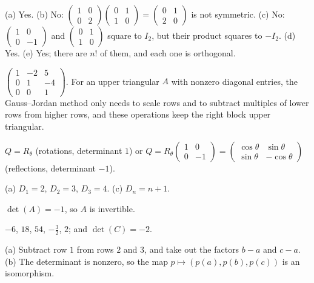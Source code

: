 \documentclass[11pt]{article}
\theoremstyle{definition}
\begin{document}
\begin{description}[leftmargin=0pt, itemsep=0.3em]
    \item[\ref{pr:groups}.] (a) Yes. (b) No: $\begin{pmatrix} 1 & 0 \\ 0 & 2 \end{pmatrix}\begin{pmatrix} 0 & 1 \\ 1 & 0 \end{pmatrix} = \begin{pmatrix} 0 & 1 \\ 2 & 0 \end{pmatrix}$ is not symmetric. (c) No: $\begin{pmatrix} 1 & 0 \\ 0 & -1 \end{pmatrix}$ and $\begin{pmatrix} 0 & 1 \\ 1 & 0 \end{pmatrix}$ square to $I_2$, but their product squares to $-I_2$. (d) Yes. (e) Yes; there are $n!$ of them, and each one is orthogonal.
    \item[\ref{pr:inverse-triangular}.] $\begin{pmatrix} 1 & -2 & 5 \\ 0 & 1 & -4 \\ 0 & 0 & 1 \end{pmatrix}$. For an upper triangular $A$ with nonzero diagonal entries, the Gauss--Jordan method only needs to scale rows and to subtract multiples of lower rows from higher rows, and these operations keep the right block upper triangular.
    \item[\ref{pr:orthogonal2}.] $Q = R_\theta$ (rotations, determinant $1$) or $Q = R_\theta \begin{pmatrix} 1 & 0 \\ 0 & -1 \end{pmatrix} = \begin{pmatrix} \cos\theta & \sin\theta \\ \sin\theta & -\cos\theta \end{pmatrix}$ (reflections, determinant $-1$).
    \item[\ref{pr:tridiagonal}.] (a) $D_1 = 2$, $D_2 = 3$, $D_3 = 4$. (c) $D_n = n + 1$.
    \item[\ref{pr:det4}.] $\det(A) = -1$, so $A$ is invertible.
    \item[\ref{pr:det-rules}.] $-6$, $18$, $54$, $-\frac{3}{2}$, $2$; and $\det(C) = -2$.
    \item[\ref{pr:vandermonde}.] (a) Subtract row $1$ from rows $2$ and $3$, and take out the factors $b - a$ and $c - a$. (b) The determinant is nonzero, so the map $p \mapsto (p(a), p(b), p(c))$ is an isomorphism.

\end{description}
\end{document}

